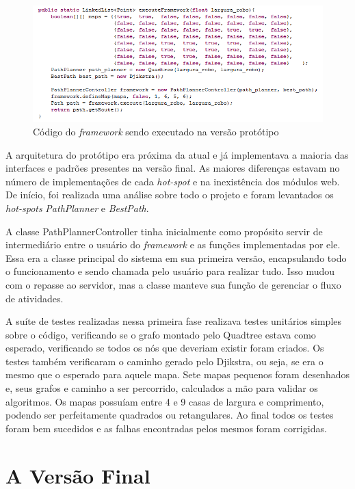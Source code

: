 \begin{figure}[h]
	\centering
	\label{fig31}
		\includegraphics[keepaspectratio=true,scale=0.8]{figuras/codigoprototipo.PNG}
	\caption{Código do \textit{framework} sendo executado na versão protótipo}
\end{figure}

A arquitetura do protótipo era próxima da atual e já implementava a maioria das interfaces e padrões presentes na versão final. As maiores diferenças estavam no número de implementações de cada \textit{hot-spot} e na inexistência dos módulos web. De início, foi realizada uma análise sobre todo o projeto e foram levantados os \textit{hot-spots} \textit{PathPlanner} e \textit{BestPath}. 

A classe PathPlannerController tinha inicialmente como propósito servir de intermediário entre o usuário do \textit{framework} e as funções implementadas por ele. Essa era a classe principal do sistema em sua primeira versão, encapsulando todo o funcionamento e sendo chamada pelo usuário para realizar tudo. Isso mudou com o repasse ao servidor, mas a classe manteve sua função de gerenciar o fluxo de atividades.

A suíte de testes realizadas nessa primeira fase realizava testes unitários simples sobre o código, verificando se o grafo montado pelo Quadtree estava como esperado, verificando se todos os nós que deveriam existir foram criados. Os testes também verificaram o caminho gerado pelo Djikstra, ou seja, se era o mesmo que o esperado para aquele mapa. Sete mapas pequenos foram desenhados e, seus grafos e caminho a ser percorrido, calculados a mão para validar os algoritmos. Os mapas possuíam entre 4 e 9 casas de largura e comprimento, podendo ser perfeitamente quadrados ou retangulares. Ao final todos os testes foram bem sucedidos e as falhas encontradas pelos mesmos foram corrigidas.

\section{A Versão Final}

